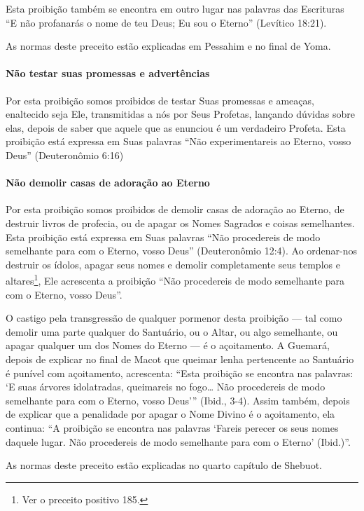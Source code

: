Esta proibição também se encontra em outro lugar nas palavras das
Escrituras ``E não profanarás o nome de teu Deus; Eu sou o Eterno''
(Levítico 18:21).

As normas deste preceito estão explicadas em Pessahim e no final de Yoma.

\paragraph{Não testar suas promessas e advertências}

Por esta proibição somos proibidos de testar Suas promessas e ameaças,
enaltecido seja Ele, transmitidas a nós por Seus Profetas, lançando
dúvidas sobre elas, depois de saber que aquele que as enunciou é um
verdadeiro Profeta. Esta proibição está expressa em Suas palavras ``Não
experimentareis ao Eterno, vosso Deus'' (Deuteronômio 6:16)

\paragraph{Não demolir casas de adoração ao Eterno}

Por esta proibição somos proibidos de demolir casas de adoração ao
Eterno, de destruir livros de profecia, ou de apagar os Nomes Sagrados e
coisas semelhantes. Esta proibição está expressa em Suas palavras ``Não
procedereis de modo semelhante para com o Eterno, vosso Deus''
(Deuteronômio 12:4). Ao ordenar-nos destruir os ídolos, apagar seus
nomes e demolir completamente seus templos e
altares\footnote{Ver o preceito positivo 185.}, Ele acrescenta a proibição ``Não
procedereis de modo semelhante para com o Eterno, vosso Deus''.

O castigo pela transgressão de qualquer pormenor desta proibição --- tal
como demolir uma parte qualquer do Santuário, ou o Altar, ou algo
semelhante, ou apagar qualquer um dos Nomes do Eterno --- é o
açoitamento. A Guemará, depois de explicar no final de Macot que queimar
lenha pertencente ao Santuário é punível com açoitamento, acrescenta:
``Esta proibição se encontra nas palavras: `E suas árvores idolatradas,
queimareis no fogo\ldots{} Não procedereis de modo semelhante para com o
Eterno, vosso Deus''' (Ibid., 3-4). Assim também, depois de explicar
que a penalidade por apagar o Nome Divino é o açoitamento, ela continua:
``A proibição se encontra nas palavras `Fareis perecer os seus nomes
daquele lugar. Não procedereis de modo semelhante para com o Eterno'
(Ibid.)''.

As normas deste preceito estão explicadas no quarto capítulo de Shebuot.

